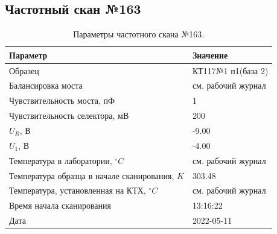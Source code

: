 \subsection{Частотный скан №163}
\begin{table}[!ht]
    \centering
    \caption{Параметры частотного скана №163.}
    \begin{tabular}{|l|l|}
        \hline
        Параметр                                       & Значение                  \\ \hline
        Образец                                        & КТ117№1 п1(база 2)        \\ \hline
        Балансировка моста                             & см. рабочий журнал        \\ \hline
        Чувствительность моста, пФ                     & 1                         \\ \hline
        Чувствительность селектора, мВ                 & 200                       \\ \hline
        $U_R$, В                                       & -9.00                     \\ \hline
        $U_1$, В                                       & -4.00                     \\ \hline
        Температура в лаборатории, $^\circ C$          & см. рабочий журнал        \\ \hline
        Температура образца в начале сканирования, $K$ & 303.48                    \\ \hline
        Температура, установленная на КТХ, $^\circ C$  & см. рабочий журнал        \\ \hline
        Время начала сканирования                      & 13:16:22                  \\ \hline
        Дата                                           & 2022-05-11                \\ \hline
    \end{tabular}
    \label{table:frequency_scan_163}
\end{table}

